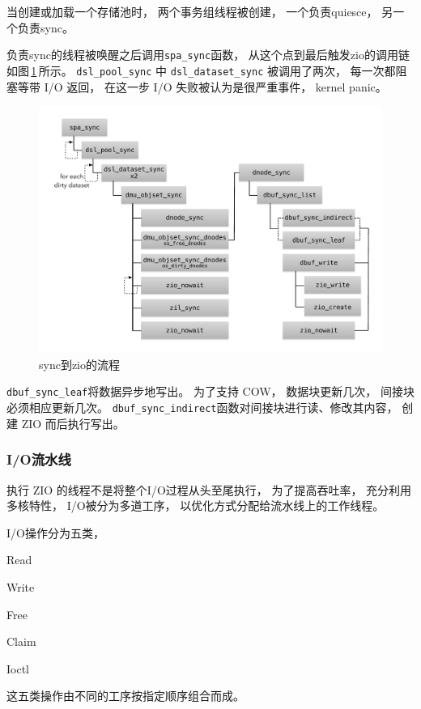 当创建或加载一个存储池时，
两个事务组线程被创建，
一个负责quiesce，
另一个负责sync。

负责sync的线程被唤醒之后调用\verb|spa_sync|函数，
从这个点到最后触发zio的调用链如图\,\ref{fig:spa_sync}\,所示。
\verb|dsl_pool_sync| 中 \verb|dsl_dataset_sync| 被调用了两次，
每一次都阻塞等带 I/O 返回，
在这一步 I/O 失败被认为是很严重事件，
kernel panic。

\begin{figure}[!ht]
  \centering
  \includegraphics[width=\textwidth]{fig/zfs_spa_sync.pdf}
  \caption{sync到zio的流程}\label{fig:spa_sync}
\end{figure}

\verb|dbuf_sync_leaf|将数据异步地写出。
为了支持 COW，
数据块更新几次，
间接块必须相应更新几次。
\verb|dbuf_sync_indirect|函数对间接块进行读、修改其内容，
创建 ZIO 而后执行写出。

\subsubsection{I/O流水线}
执行 ZIO 的线程不是将整个I/O过程从头至尾执行，
为了提高吞吐率，
充分利用多核特性，
I/O被分为多道工序，
以优化方式分配给流水线上的工作线程。

I/O操作分为五类，
\begin{enumerate*}[label=\itshape\arabic*\upshape)]
  \item Read
  \item Write
  \item Free
  \item Claim
  \item Ioctl
\end{enumerate*}
这五类操作由不同的工序按指定顺序组合而成。

